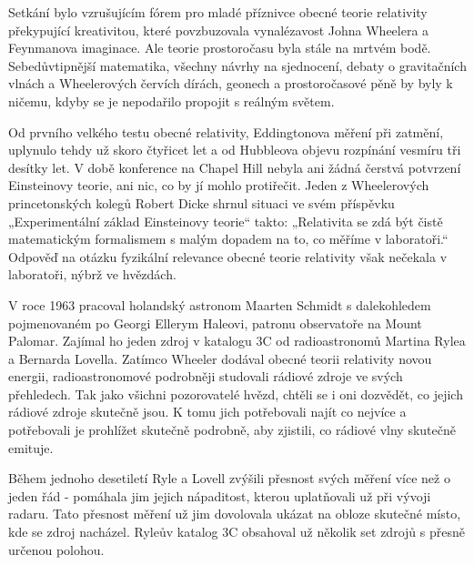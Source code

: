   Setkání bylo vzrušujícím fórem pro mladé příznivce obecné teorie relativity překypující
  kreativitou, které povzbuzovala vynalézavost Johna Wheelera a Feynmanova imaginace. Ale teorie
  prostoročasu byla stále na mrtvém bodě. Sebedůvtipnější matematika, všechny návrhy na sjednocení,
  debaty o gravitačních vlnách a Wheelerových červích dírách, geonech a prostoročasové pěně by byly
  k ničemu, kdyby se je nepodařilo propojit s reálným světem. 

  Od prvního velkého testu obecné relativity, Eddingtonova měření při zatmění, uplynulo tehdy už
  skoro čtyřicet let a od Hubbleova objevu rozpínání vesmíru tři desítky let. V době konference na
  Chapel Hill nebyla ani žádná čerstvá potvrzení Einsteinovy teorie, ani nic, co by jí mohlo
  protiřečit. Jeden z Wheelerových princetonských kolegů Robert Dicke shrnul situaci ve svém
  příspěvku „Experimentální základ Einsteinovy teorie“ takto: „Relativita se zdá být čistě
  matematickým formalismem s malým dopadem na to, co měříme v laboratoři.“ Odpověď na otázku
  fyzikální relevance obecné teorie relativity však nečekala v laboratoři, nýbrž ve hvězdách.

  V roce 1963 pracoval holandský astronom Maarten Schmidt s dalekohledem pojmenovaném po Georgi
  Ellerym Haleovi, patronu observatoře na Mount Palomar. Zajímal ho jeden zdroj v katalogu 3C od
  radioastronomů Martina Rylea a Bernarda Lovella. Zatímco Wheeler dodával obecné teorii relativity
  novou energii, radioastronomové podrobněji studovali rádiové zdroje ve svých přehledech. Tak jako
  všichni pozorovatelé hvězd, chtěli se i oni dozvědět, co jejich rádiové zdroje skutečně jsou. K
  tomu jich potřebovali najít co nejvíce a potřebovali je prohlížet skutečně podrobně, aby zjistili,
  co rádiové vlny skutečně emituje. 

  Během jednoho desetiletí Ryle a Lovell zvýšili přesnost svých měření více než o jeden řád -
  pomáhala jim jejich nápaditost, kterou uplatňovali už při vývoji radaru. Tato přesnost měření už
  jim dovolovala ukázat na obloze skutečné místo, kde se zdroj nacházel. Ryleův katalog 3C obsahoval
  už několik set zdrojů s přesně určenou polohou. 

